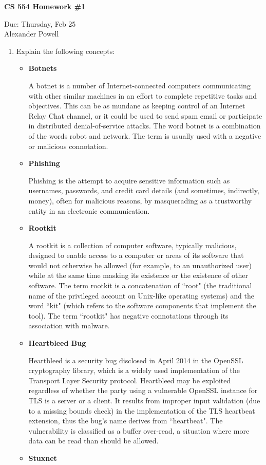 \documentclass[11pt]{article}
\begin{document}
\begin{center}             %
\begin{LARGE}
{\bf CS 554 Homework \#1}
\end{LARGE}
\vskip 0.25cm      %

Due: Thursday, Feb 25\\  %
Alexander Powell
\end{center}

\begin{enumerate}[1)]
\item Explain the following concepts:
\begin{itemize}
\item \textbf{Botnets}

A botnet is a number of Internet-connected computers communicating with other similar machines in an effort to complete repetitive tasks and objectives. This can be as mundane as keeping control of an Internet Relay Chat channel, or it could be used to send spam email or participate in distributed denial-of-service attacks. The word botnet is a combination of the words robot and network. The term is usually used with a negative or malicious connotation.
\item \textbf{Phishing}

Phishing is the attempt to acquire sensitive information such as usernames, passwords, and credit card details (and sometimes, indirectly, money), often for malicious reasons, by masquerading as a trustworthy entity in an electronic communication.
\item \textbf{Rootkit}

A rootkit is a collection of computer software, typically malicious, designed to enable access to a computer or areas of its software that would not otherwise be allowed (for example, to an unauthorized user) while at the same time masking its existence or the existence of other software. The term rootkit is a concatenation of ``root" (the traditional name of the privileged account on Unix-like operating systems) and the word ``kit" (which refers to the software components that implement the tool). The term ``rootkit" has negative connotations through its association with malware.
\item \textbf{Heartbleed Bug}

Heartbleed is a security bug disclosed in April 2014 in the OpenSSL cryptography library, which is a widely used implementation of the Transport Layer Security protocol. Heartbleed may be exploited regardless of whether the party using a vulnerable OpenSSL instance for TLS is a server or a client. It results from improper input validation (due to a missing bounds check) in the implementation of the TLS heartbeat extension, thus the bug's name derives from ``heartbeat". The vulnerability is classified as a buffer over-read, a situation where more data can be read than should be allowed.
\item \textbf{Stuxnet}


\end{itemize}
\end{enumerate}
\end{document}
